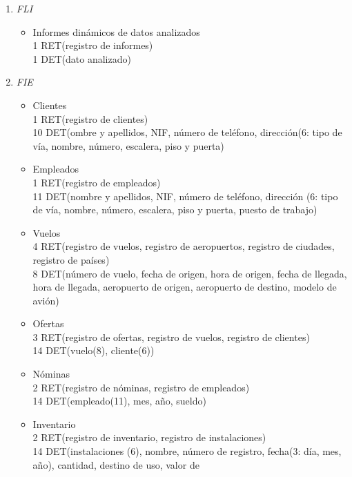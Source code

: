 \begin{enumerate}
			\item \textit{FLI}
				\begin{itemize}
					\item Informes dinámicos de datos analizados \\
					1 RET(registro de informes) \\
					1 DET(dato analizado) \\
				\end{itemize}
			\item \textit{FIE}
				\begin{itemize}
					\item Clientes  \\
					1 RET(registro de clientes) \\
					10 DET(ombre y apellidos, NIF, número de teléfono, dirección(6: tipo de vía, nombre, número, escalera, piso y puerta) \\
					\item Empleados \\
					1 RET(registro de empleados) \\
					11 DET(nombre y apellidos, NIF, número de teléfono, dirección (6: tipo de vía, nombre, número, escalera, piso y puerta,
					puesto de trabajo) \\
					\item Vuelos \\
					4 RET(registro de vuelos, registro de aeropuertos, registro de ciudades, registro de países) \\
					8 DET(número de vuelo, fecha de origen, hora de origen, fecha de llegada, hora de llegada, aeropuerto de origen,
					aeropuerto de destino, modelo de avión) \\
					\item Ofertas \\
					3 RET(registro de ofertas, registro de vuelos, registro de clientes) \\
					14 DET(vuelo(8), cliente(6)) \\
					\item Nóminas \\
					2 RET(registro de nóminas, registro de empleados) \\
					14 DET(empleado(11), mes, año, sueldo) \\
					\item Inventario \\
					2 RET(registro de inventario, registro de instalaciones) \\
					14 DET(instalaciones (6), nombre, número de registro, fecha(3: día, mes, año), cantidad, destino de uso, valor de

\end{itemize}
\end{enumerate}
